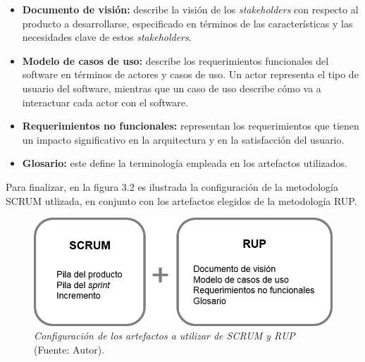 		\begin{itemize}
			\item \textbf{Documento de visi\'{o}n: }describe la visi\'{o}n de los \textit{stakeholders} con respecto al producto a desarrollarse, especificado en t\'{e}rminos de las caracter\'{i}sticas y las necesidades clave de estos \textit{stakeholders}.
			
			\item \textbf{Modelo de casos de uso: }describe los requerimientos funcionales del software en t\'{e}rminos de actores y casos de uso. Un actor representa el tipo de usuario del software, mientras que un caso de uso describe c\'{o}mo va a interactuar cada actor con el software.
			
			\item \textbf{Requerimientos no funcionales: } representan los requerimientos que tienen un impacto significativo en la arquitectura y en la satisfacci\'{o}n del usuario.
			
			\item \textbf{Glosario: }este define la terminolog\'{i}a empleada en los artefactos utilizados.
		\end{itemize}

Para finalizar, en la figura 3.2 es ilustrada la configuraci\'{o}n de la metodolog\'{i}a SCRUM utlizada, en conjunto con los artefactos elegidos de la metodolog\'{i}a RUP.
	
	\FloatBarrier
	\begin{figure}[h]
		\centering
		\includegraphics[scale=0.8]{img/SCRUM-RUP.png}
			\caption[Configuraci\'{o}n de los artefactos a utilizar de SCRUM y RUP]{\textit{Configuraci\'{o}n de los artefactos a utilizar de SCRUM y RUP} (Fuente: Autor).}
	\end{figure}
	\FloatBarrier
	